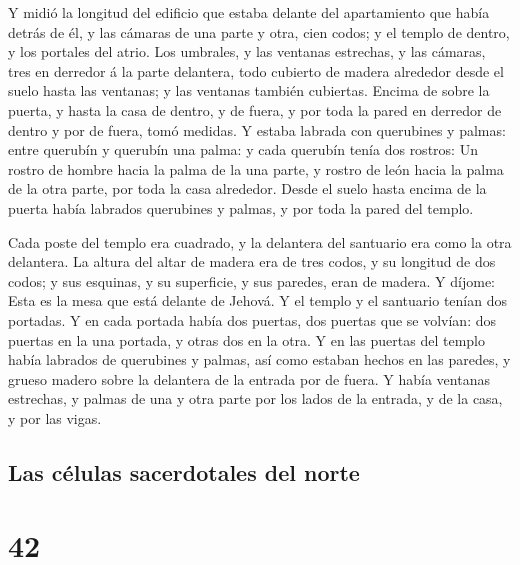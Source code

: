  Y midió la longitud del edificio que estaba delante del
apartamiento que había detrás de él, y las cámaras de una parte y otra,
cien codos; y el templo de dentro, y los portales del atrio.
 Los umbrales, y las ventanas estrechas, y las cámaras,
tres en derredor á la parte delantera, todo cubierto de madera alrededor
desde el suelo hasta las ventanas; y las ventanas también cubiertas.
 Encima de sobre la puerta, y hasta la casa de dentro, y de
fuera, y por toda la pared en derredor de dentro y por de fuera, tomó
medidas.  Y estaba labrada con querubines y palmas: entre
querubín y querubín una palma: y cada querubín tenía dos rostros:
 Un rostro de hombre hacia la palma de la una parte, y
rostro de león hacia la palma de la otra parte, por toda la casa
alrededor.  Desde el suelo hasta encima de la puerta había
labrados querubines y palmas, y por toda la pared del templo.

 Cada poste del templo era cuadrado, y la delantera del
santuario era como la otra delantera.  La altura del altar
de madera era de tres codos, y su longitud de dos codos; y sus esquinas,
y su superficie, y sus paredes, eran de madera. Y díjome: Esta es la
mesa que está delante de Jehová.  Y el templo y el
santuario tenían dos portadas.  Y en cada portada había dos
puertas, dos puertas que se volvían: dos puertas en la una portada, y
otras dos en la otra.  Y en las puertas del templo había
labrados de querubines y palmas, así como estaban hechos en las paredes,
y grueso madero sobre la delantera de la entrada por de fuera.
 Y había ventanas estrechas, y palmas de una y otra parte
por los lados de la entrada, y de la casa, y por las vigas.

\hypertarget{las-cuxe9lulas-sacerdotales-del-norte}{%
\subsection{Las células sacerdotales del
norte}\label{las-cuxe9lulas-sacerdotales-del-norte}}

\hypertarget{section-41}{%
\section{42}\label{section-41}}

